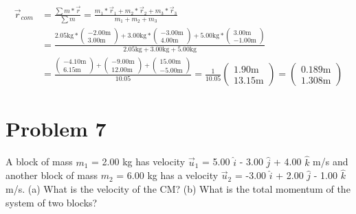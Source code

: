 \documentclass[12pt]{article}
\begin{document}
\begin{align*}
    \vec{r}_{com}   &=  \frac{\sum m*\vec{r}}{\sum m}
        =   \frac{ m_1*\vec{r}_1 + m_2*\vec{r}_2 + m_3*\vec{r}_3 }{ m_1 + m_2 + m_3 }\\
        &=  \frac{ 2.05\unit{\kilo\gram}*\left(\begin{smallmatrix}-2.00\unit{\meter}\\3.00\unit{\meter}\end{smallmatrix}\right) + 3.00\unit{\kilo\gram}*\left(\begin{smallmatrix}-3.00\unit{\meter}\\4.00\unit{\meter}\end{smallmatrix}\right) + 5.00\unit{\kilo\gram}*\left(\begin{smallmatrix}3.00\unit{\meter}\\-1.00\unit{\meter}\end{smallmatrix}\right) }{ 2.05\unit{\kilo\gram} + 3.00\unit{\kilo\gram} + 5.00\unit{\kilo\gram} }\\
        &=  \frac{ \left(\begin{smallmatrix}-4.10\unit{\meter}\\6.15\unit{\meter}\end{smallmatrix}\right) + \left(\begin{smallmatrix}-9.00\unit{\meter}\\12.00\unit{\meter}\end{smallmatrix}\right) + \left(\begin{smallmatrix}15.00\unit{\meter}\\-5.00\unit{\meter}\end{smallmatrix}\right) }{ 10.05 }
        =   \frac{1}{10.05}\begin{pmatrix} 1.90\unit{\meter} \\ 13.15\unit{\meter} \end{pmatrix}
        = \boxed{\begin{pmatrix} 0.189\unit{\meter} \\ 1.308\unit{\meter} \end{pmatrix}}
\end{align*}

\pagebreak
\section*{Problem 7}
A block of mass $m_1$ = 2.00 kg has velocity $\vec{u}_1$ = 5.00 $\hat{i}$ - 3.00 $\hat{j}$ + 4.00 $\hat{k}$ m/s and another block of mass $m_2$ = 6.00 kg has a velocity $\vec{u}_2$ = -3.00 $\hat{i}$ + 2.00 $\hat{j}$ - 1.00 $\hat{k}$ m/s. (a) What is the velocity of the CM? (b) What is the total momentum of the system of two blocks?
\end{document}
